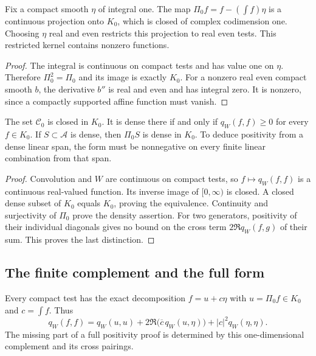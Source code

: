 \begin{proposition}
\label{v4-arith:w7-i:rem:CP-nonempty}
Fix a compact smooth $\eta$ of integral one. The map
$\Pi_0 f=f-(\int f)\eta$ is a continuous projection onto $K_0$,
which is closed of complex codimension one.
Choosing $\eta$ real and even restricts this projection to real
even tests. This restricted kernel contains nonzero functions.
\end{proposition}
\begin{proof}
The integral is continuous on compact tests and has value one on
$\eta$. Therefore $\Pi_0^2=\Pi_0$ and its image is exactly $K_0$.
For a nonzero real even compact smooth $b$, the derivative $b''$
is real and even and has integral zero. It is nonzero, since a
compactly supported affine function must vanish.
\end{proof}

\begin{theorem}
\label{v4-arith:w7-i:thm:copoisson-closure}
\label{v4-arith:w7-i:prop:BM-rule-out}
The set $\mathcal C_0$ is closed in $K_0$.
It is dense there if and only if $q_W(f,f)\ge0$ for every $f\in K_0$.
If $S\subset\mathscr A$ is dense, then $\Pi_0S$ is dense in $K_0$.
To deduce positivity from a dense linear span, the form must be
nonnegative on every finite linear combination from that span.
\end{theorem}
\begin{proof}
Convolution and $W$ are continuous on compact tests, so
$f\mapsto q_W(f,f)$ is a continuous real-valued function.
Its inverse image of $[0,\infty)$ is closed. A closed dense subset
of $K_0$ equals $K_0$, proving the equivalence.
Continuity and surjectivity of $\Pi_0$ prove the density assertion.
For two generators, positivity of their individual diagonals gives
no bound on the cross term $2\Re q_W(f,g)$ of their sum.
This proves the last distinction.
\end{proof}

\subsection{The finite complement and the full form}
\label{v4-arith:w7-i:copoisson:explicit}
\label{v4-arith:w7-i:burnol-residual}

Every compact test has the exact decomposition
$f=u+c\eta$ with $u=\Pi_0f\in K_0$ and $c=\int f$.
Thus
\begin{equation}
\label{v4-arith:w7-i:eq:CP3}
 q_W(f,f)=q_W(u,u)+2\Re\bigl(\overline c\,q_W(u,\eta)\bigr)
                         +|c|^2q_W(\eta,\eta).
\end{equation}
The missing part of a full positivity proof is determined by this
one-dimensional complement and its cross pairings.

